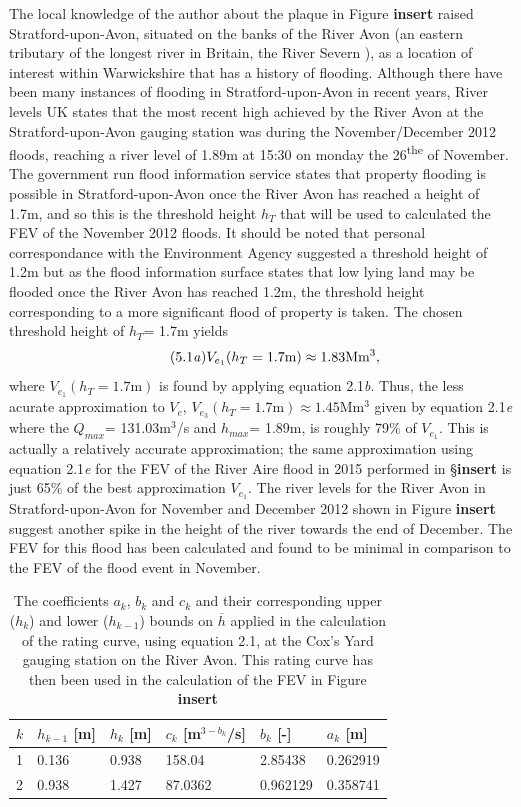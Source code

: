 \documentclass[11pt,a4paper]{article}
\begin{document}
The local knowledge of the author about the plaque in Figure \textbf{insert} raised Stratford-upon-Avon, situated on the banks of the River Avon (an eastern tributary of the longest river in Britain, the River Severn \cite{britannica}), as a location of interest within Warwickshire that has a history of flooding. Although there have been many instances of flooding in Stratford-upon-Avon in recent years, River levels UK \cite{recent-high} states that the most recent high achieved by the River Avon at the Stratford-upon-Avon gauging station was during the November/December 2012 floods, reaching a river level of 1.89m at 15:30 on monday the 26\textsuperscript{the} of November. The government run flood information service \cite{ht} states that property flooding is possible in Stratford-upon-Avon once the River Avon has reached a height of 1.7m, and so this is the threshold height $h_T$ that will be used to calculated the FEV of the November 2012 floods. It should be noted that personal correspondance with the Environment Agency \cite{EA} suggested a threshold height of 1.2m but as the flood information surface states that low lying land may be flooded once the River Avon has reached 1.2m, the threshold height corresponding to a more significant flood of property is taken. The chosen threshold height of $h_T$= 1.7m yields
\begin{equation}\tag{5.1\textit{a}}
V_{e_1}(h_T=\text{1.7m})\approx 1.83\text{Mm$^3$},
\end{equation}
where $V_{e_1}(h_T=\text{1.7m})$ is found by applying equation 2.1\textit{b}. Thus, the less acurate approximation to $V_e$, $V_{e_3}(h_T=\text{1.7m})\approx 1.45\text{Mm$^3$}$ given by equation 2.1\textit{e} where the $Q_{max}$= 131.03m$^3$/s and $h_{max}$= 1.89m, is roughly 79\% of $V_{e_1}$. This is actually a relatively accurate approximation{;} the same approximation using equation 2.1\textit{e} for the FEV of the River Aire flood in 2015 performed in \S \textbf{insert} is just 65\% of the best approximation $V_{e_1}$. The river levels for the River Avon in Stratford-upon-Avon for November and December 2012 shown in Figure \textbf{insert} suggest another spike in the height of the river towards the end of December. The FEV for this flood has been calculated and found to be minimal in comparison to the FEV of the flood event in November. 

\begin{table}[ht!]
\begin{tabular}{l|l|l|l|l|l}
$k$ & $h_{k-1}$ [m] & $h_k$ [m] & $c_k$ [m$^{3-b_k}$/s] & $b_k$ [-] & $a_k$ [m]\\
\hline
1 & 0.136 & 0.938 & 158.04 & 2.85438 & 0.262919 \\
2 & 0.938 & 1.427 & 87.0362 & 0.962129 & 0.358741 \\
\end{tabular}
\caption{The coefficients $a_k$, $b_k$ and $c_k$ and their corresponding upper ($h_k$) and lower ($h_{k-1}$) bounds on $\overline{h}$ \cite{EA} applied in the calculation of the rating curve, using equation 2.1, at the Cox's Yard gauging station on the River Avon. This rating curve has then been used in the calculation of the FEV in Figure \textbf{insert}}
\end{table}
\end{document}
